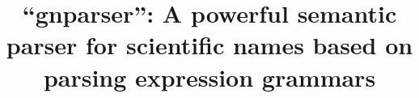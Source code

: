 \documentclass{bmcart}
\begin{document}
\begin{frontmatter}

\begin{fmbox}


\title{``gnparser'':  A powerful semantic parser for scientific names based on
  parsing expression grammars}



\author[
   addressref={aff1},
   corref={aff1},                       %
   email={mozzheri@illinois.edu}
]{ }
\author[                  %
   addressref={aff2},
   noteref={n1},%
   email={alexander@myltsev.com}   %
]{ }
\author[
   addressref={aff3},
   email={dpatterson.mbl@gmail.com}
]{ }


\address[id=aff1]{                     %
  ,    %
  ,         %
  ,                    %
  ,
  ,
}


\end{fmbox}
\end{frontmatter}
\end{document}
